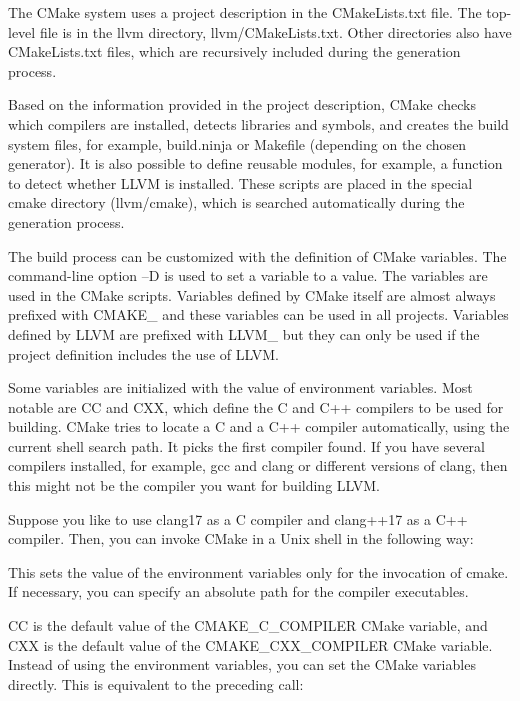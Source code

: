 
The CMake system uses a project description in the CMakeLists.txt file. The top-level file is in the llvm directory, llvm/CMakeLists.txt. Other directories also have CMakeLists.txt files, which are recursively included during the generation process.

Based on the information provided in the project description, CMake checks which compilers are installed, detects libraries and symbols, and creates the build system files, for example, build.ninja or Makefile (depending on the chosen generator). It is also possible to define reusable modules, for example, a function to detect whether LLVM is installed. These scripts are placed in the special cmake directory (llvm/cmake), which is searched automatically during the generation process.

The build process can be customized with the definition of CMake variables. The command-line option –D is used to set a variable to a value. The variables are used in the CMake scripts. Variables defined by CMake itself are almost always prefixed with CMAKE\_ and these variables can be used in all projects. Variables defined by LLVM are prefixed with LLVM\_ but they can only be used if the project definition includes the use of LLVM.



Some variables are initialized with the value of environment variables. Most notable are CC and CXX, which define the C and C++ compilers to be used for building. CMake tries to locate a C and a C++ compiler automatically, using the current shell search path. It picks the first compiler found. If you have several compilers installed, for example, gcc and clang or different versions of clang, then this might not be the compiler you want for building LLVM.

Suppose you like to use clang17 as a C compiler and clang++17 as a C++ compiler. Then, you can invoke CMake in a Unix shell in the following way:


This sets the value of the environment variables only for the invocation of cmake. If necessary, you can specify an absolute path for the compiler executables.

CC is the default value of the CMAKE\_C\_COMPILER CMake variable, and CXX is the default value of the CMAKE\_CXX\_COMPILER CMake variable. Instead of using the environment variables, you can set the CMake variables directly. This is equivalent to the preceding call:

